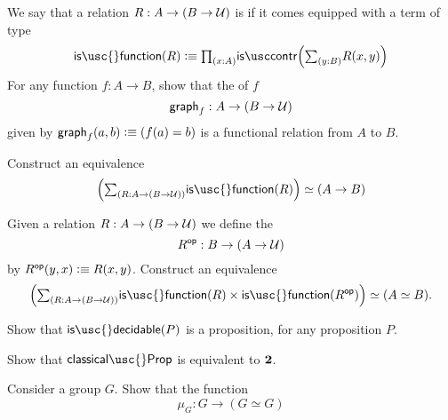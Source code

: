 \begin{exercises}
\begin{subexenum}
\begin{equation*}
\end{equation*}
\item We say that a relation $R:A\to (B\to\mathcal{U})$ is  if it comes equipped with a term of type
\begin{equation*}
\mathsf{is\usc{}function}(R) \defeq \prd{x:A}\iscontr\Big(\sm{y:B}R(x,y)\Big)
\end{equation*}
For any function $f:A\to B$, show that the  of $f$ 
\begin{equation*}
\mathsf{graph}_f:A\to (B\to \mathcal{U})
\end{equation*}
given by $\mathsf{graph}_f(a,b)\vcentcolon\equiv (f(a)=b)$ is a functional relation from $A$ to $B$.
\item Construct an equivalence
\begin{equation*}
\eqv{\Big(\sm{R:A\to (B\to\UU)}\mathsf{is\usc{}function}(R)\Big)}{(A\to B)}
\end{equation*}
\item Given a relation $R:A\to (B\to \mathcal{U})$ we define the 
\begin{equation*}
R^{\mathsf{op}} : B\to (A\to\mathcal{U})
\end{equation*}
by $R^{\mathsf{op}}(y,x)\vcentcolon\equiv R(x,y)$. Construct an equivalence
\begin{equation*}
\eqv{\Big(\sm{R:A\to (B\to \UU)}\mathsf{is\usc{}function}(R)\times\mathsf{is\usc{}function}(R^{\mathsf{op}})\Big)}{(\eqv{A}{B})}.
\end{equation*}
\end{subexenum}
\item
  \begin{subexenum}
  \item Show that $\mathsf{is\usc{}decidable}(P)$ is a proposition, for any proposition $P$.
  \item Show that $\mathsf{classical\usc{}Prop}$ is equivalent to $\mathbf{2}$.
  \end{subexenum}
\item
  \begin{subexenum}
  \item Consider a group $G$. Show that the function
    \begin{equation*}
      \mu_G:G\to (G\simeq G)
    \end{equation*}

\end{subexenum}
\end{exercises}
